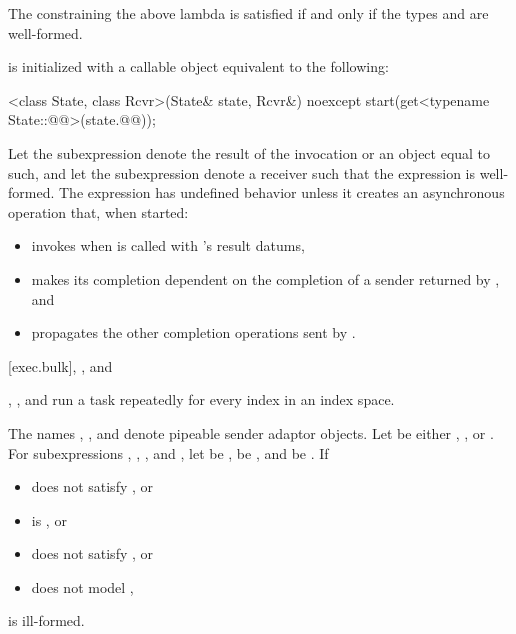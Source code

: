 \pnum
The  constraining the above lambda is satisfied
if and only if
the types  and  are well-formed.

\pnum
{}
is initialized with a callable object equivalent to the following:
\begin{codeblock}
[]<class State, class Rcvr>(State& state, Rcvr&) noexcept {
  start(get<typename State::@@>(state.@@));
}
\end{codeblock}

\pnum
Let the subexpression  denote
the result of the invocation  or
an object equal to such, and
let the subexpression  denote a receiver
such that the expression  is well-formed.
The expression  has undefined behavior
unless it creates an asynchronous operation that,
when started:
\begin{itemize}
\item
invokes  when  is called
with 's result datums,
\item
makes its completion dependent on
the completion of a sender returned by , and
\item
propagates the other completion operations sent by .
\end{itemize}

[exec.bulk]{, , and }

\pnum
{}, , and 
run a task repeatedly for every index in an index space.

\pnum
The names , , and 
denote pipeable sender adaptor objects.
Let  be either
, , or .
For subexpressions , , , and ,
let
 be ,
 be , and
 be .
If
\begin{itemize}
\item
{} does not satisfy , or
\item
{} is , or
\item
{} does not satisfy , or
\item
{} does not model ,
\end{itemize}
 is ill-formed.

